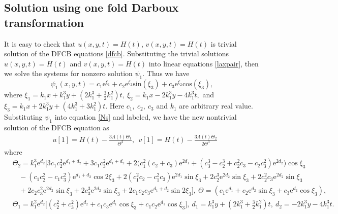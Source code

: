 \documentclass{article}%
\begin{document}
\subsection{Solution using one fold Darboux transformation}
It is easy to check that $u(x,y,t)=H(t)$, $v(x,y,t)=H(t)$ is trivial  solution of the DFCB  equations \eqref{dfcb}. Substituting the trivial solutions $u(x,y,t)=H(t)$ and $v(x,y,t)=H(t)$ into linear equations \eqref{laxpair}, then we solve the systems for nonzero solution $\psi_{1}$. Thus we have
\begin{equation}
\psi_{1}(x,y,t)=c_1\text{e}^{\xi_1}+c_2\text{e}^{\xi_2}\text{sin}(\xi_3)+c_3\text{e}^{\xi_2}\text{cos}(\xi_3),
\end{equation}
where $\xi_1=k_1x+k_1^3y+(2k_1^3+\frac{3}{2}k_1^2)t,~ \xi_2=k_1x-2k_1^3y-4k_1^3t,$ and $\xi_3=k_1x+2k_1^3y+(4k_1^3+3k_1^2)t$. Here $c_1, ~c_2,~c_3 $ and $k_1$ are arbitrary real value. Substituting $\psi_1$ into equation \eqref{Ns} and labeled, we have the new nontrivial solution of the DFCB equation as
\begin{equation}
\begin{split}
&u[1]=H(t)-\frac{3\Lambda(t) \Theta_1}{\Theta^2},~~
v[1]=H(t)-\frac{3\Lambda(t)\Theta_2}{2\Theta^3}
\end{split}
\end{equation}
where
\begin{equation*}
\begin{split}
&\Theta_2=k_1^3\text{e}^{d_2}\bigg [  3c_1c_2^2\text{e}^{d_1+d_2}+3c_1c_3^2\text{e}^{d_1+d_2}+2\bigg ( c_1^2(c_2+c_3)\text{e}^{2d_1}+(c_3^3-c_2^3+c_2^2c_3-c_2c_3^2)\text{e}^{2d_2}\bigg)\cos\xi_3\\
&~~~~-(c_1c_2^2-c_1c_3^2)\text{e}^{d_1+d_2}\cos 2\xi_3+2(c_1^2c_2-c_1^2c_3)\text{e}^{2d_1}\sin \xi_3+2c_2^3\text{e}^{2d_2}\sin \xi_3+2c_2^2c_3\text{e}^{2d_2}\sin \xi_3\\&~~~~+2c_2c_3^2\text{e}^{2d_2}\sin \xi_3+2c_3^3\text{e}^{2d_2}\sin \xi_3+2c_1c_2c_3\text{e}^{d_1+d_2}\sin 2\xi_3\bigg],
~\Theta=(c_1\text{e}^{d_1}+c_2\text{e}^{d_2}\sin \xi_3+c_3\text{e}^{d_2}\cos \xi_3),\\
&\Theta_1=k_1^2\text{e}^{d_2}\bigg[(c_2^2+c_3^2)\text{e}^{d_2}+c_1c_3\text{e}^{d_1}\cos\xi_3+c_1c_2\text{e}^{d_1}\cos\xi_3\bigg],
~d_1=k_1^3y+(2k_1^3+\frac{3}{2}k_1^2)t,
~d_2=-2k_1^3y-4k_1^3t.
\end{split}
\end{equation*}
\end{document}
